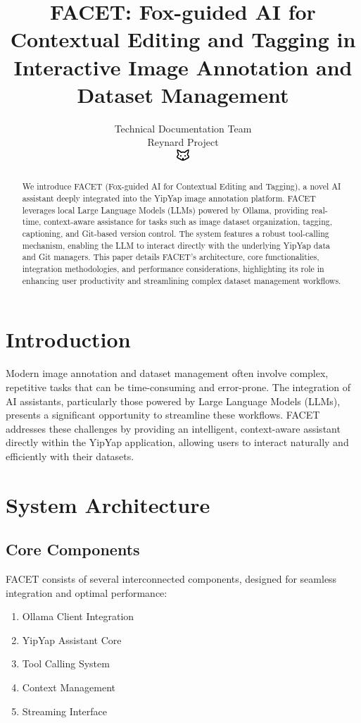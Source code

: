 \documentclass[10pt]{article}
\begin{document}
\title{FACET: Fox-guided AI for Contextual Editing and Tagging in Interactive Image Annotation and Dataset Management}

\author{Technical Documentation Team\\
Reynard Project\\
\includegraphics[width=0.5cm]{../../shared-assets/favicon.pdf}}

\maketitle

\begin{abstract}
We introduce FACET (Fox-guided AI for Contextual Editing and Tagging), a novel AI assistant deeply integrated into the YipYap image annotation platform. FACET leverages local Large Language Models (LLMs) powered by Ollama, providing real-time, context-aware assistance for tasks such as image dataset organization, tagging, captioning, and Git-based version control. The system features a robust tool-calling mechanism, enabling the LLM to interact directly with the underlying YipYap data and Git managers. This paper details FACET's architecture, core functionalities, integration methodologies, and performance considerations, highlighting its role in enhancing user productivity and streamlining complex dataset management workflows.
\end{abstract}

\section{Introduction}
Modern image annotation and dataset management often involve complex, repetitive tasks that can be time-consuming and error-prone. The integration of AI assistants, particularly those powered by Large Language Models (LLMs), presents a significant opportunity to streamline these workflows. FACET addresses these challenges by providing an intelligent, context-aware assistant directly within the YipYap application, allowing users to interact naturally and efficiently with their datasets.

\section{System Architecture}
\subsection{Core Components}
FACET consists of several interconnected components, designed for seamless integration and optimal performance:
\begin{enumerate}
    \item Ollama Client Integration
    \item YipYap Assistant Core
    \item Tool Calling System
    \item Context Management
    \item Streaming Interface
\end{enumerate}
\end{document}
